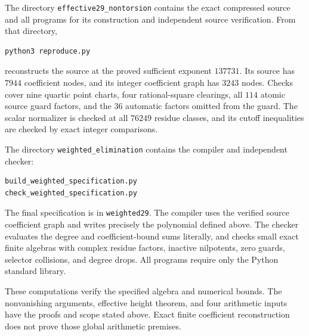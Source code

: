 \documentclass[11pt,a4paper]{article}
\begin{document}
The directory \texttt{effective29\_nontorsion} contains the exact
compressed source and all programs for its construction and independent
source verification. From that directory,
\begin{verbatim}
python3 reproduce.py
\end{verbatim}
reconstructs the source at the proved sufficient exponent $137731$.
Its source has $7944$ coefficient nodes, and its integer coefficient
graph has $3243$ nodes. Checks cover nine quartic point charts, four
rational-square clearings, all $114$ atomic source guard factors,
and the $36$ automatic factors omitted from the guard. The scalar
normalizer is checked at all $76249$ residue classes, and its cutoff
inequalities are checked by exact integer comparisons.

\begin{samepage}
The directory \texttt{weighted\_elimination} contains the compiler and
independent checker:
\begin{verbatim}
build_weighted_specification.py
check_weighted_specification.py
\end{verbatim}
\end{samepage}
The final specification is in \texttt{weighted29}. The compiler uses the verified source
coefficient graph and writes precisely the polynomial defined above.
The checker evaluates the degree and coefficient-bound sums literally,
and checks small exact finite algebras with complex residue factors,
inactive nilpotents, zero guards, selector collisions, and degree drops.
All programs require only the Python standard library.

These computations verify the specified algebra and numerical bounds.
The nonvanishing arguments, effective height theorem, and four
arithmetic inputs have the proofs and scope stated above. Exact finite
coefficient reconstruction does not prove those global arithmetic
premises.
\end{document}
